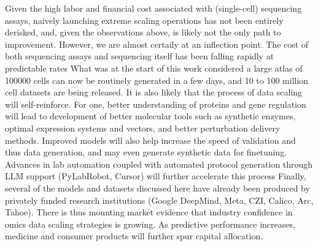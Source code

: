 

Given the high labor and financial cost associated with (single-cell) sequencing assays, naively launching extreme scaling operations has not been entirely derisked, and, given the observations above, is likely not the only path to improvement. However, we are almost certaily at an inflection point. The cost of both sequencing assays and sequencing itself has been falling rapidly at predictable rates What was at the start of this work considered a large atlas of \num{100000} cells can now be routinely generated in a few days, and 10 to 100 million cell datasets are being released. It is also likely that the process of data scaling will self-reinforce. For one, better understanding of proteins and gene regulation will lead to development of better molecular tools such as synthetic enzymes, optimal expression systems and vectors, and better perturbation delivery methods. Improved models will also help increase the speed of validation and thus data generation, and may even generate synthetic data for finetuning. Advances in lab automation coupled with automated protocol generation through LLM support (PyLabRobot, Cursor) will further accelerate this process Finally, several of the models and datasets discussed here have already been produced by privately funded research institutions (Google DeepMind, Meta, CZI, Calico, Arc, Tahoe). There is thus mounting market evidence that industry confidence in omics data scaling strategies is growing. As predictive performance increases, medicine and consumer products will further spur capital allocation.

